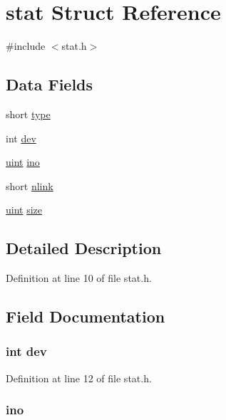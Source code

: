 \hypertarget{structstat}{\section{stat Struct Reference}
\label{structstat}
}


{\ttfamily \#include $<$stat.\-h$>$}

\subsection*{Data Fields}
\begin{DoxyCompactItemize}
\item 
short \hyperlink{structstat_acd579dfd50a9ea905ca697ed8707bf3b}{type}
\item 
int \hyperlink{structstat_a22c99b5ae74d0e3dcf126f0d950538e4}{dev}
\item 
\hyperlink{types_8h_a91ad9478d81a7aaf2593e8d9c3d06a14}{uint} \hyperlink{structstat_a928a75be0d96aba7e4cfeacfab8cdeb2}{ino}
\item 
short \hyperlink{structstat_aa7e1ed70907ed9a2fc9c9a7c24cd0d4d}{nlink}
\item 
\hyperlink{types_8h_a91ad9478d81a7aaf2593e8d9c3d06a14}{uint} \hyperlink{structstat_a22d26304a3b3aca97e6311f6939dd1bf}{size}
\end{DoxyCompactItemize}


\subsection{Detailed Description}


Definition at line 10 of file stat.\-h.



\subsection{Field Documentation}
\hypertarget{structstat_a22c99b5ae74d0e3dcf126f0d950538e4}{
\subsubsection[{dev}]{\setlength{\rightskip}{0pt plus 5cm}int dev}}\label{structstat_a22c99b5ae74d0e3dcf126f0d950538e4}


Definition at line 12 of file stat.\-h.

\hypertarget{structstat_a928a75be0d96aba7e4cfeacfab8cdeb2}{
\subsubsection[{ino}]{ ino}}\label{structstat_a928a75be0d96aba7e4cfeacfab8cdeb2}


